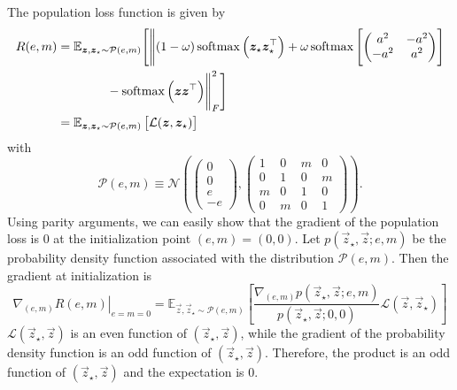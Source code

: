 The population loss function is given by
\begin{equation}\begin{split}
    R(e,m) &= \mathbb{E}_{{\boldsymbol{z}},{\boldsymbol{z}}_\star \sim \mathcal{P}(e,m)} \Biggl[\Biggl\lVert
        (1-\omega) \operatorname{softmax}\left({\boldsymbol{z}}_\star {\boldsymbol{z}}_\star^\top \right) + \omega \operatorname{softmax}\left[\begin{pmatrix}
        a^2 & -a^2 \\
        -a^2 & a^2 \\
    \end{pmatrix}\right] \\
    &\qquad\qquad {}- \operatorname{softmax}\left({\boldsymbol{z}} {\boldsymbol{z}}^\top \right)
    \Biggr\rVert_F^2\Biggr] \\
    &= \mathbb{E}_{{\boldsymbol{z}},{\boldsymbol{z}}_\star \sim \mathcal{P}(e,m)} \left[\mathcal{L}({\boldsymbol{z}},{\boldsymbol{z}}_\star)\right]
\end{split}\end{equation}
with
\begin{equation}
    \mathcal{P}(e,m) \equiv \mathcal{N}\left(
        \begin{pmatrix} 0\\ 0\\ e\\ -e \end{pmatrix},
        \begin{pmatrix}
            1 & 0 & m & 0 \\
            0 & 1 & 0 & m \\
            m & 0 & 1 & 0 \\
            0 & m & 0 & 1
        \end{pmatrix}
    \right).
\end{equation}
Using parity arguments, we can easily show that the gradient of the population loss is 0 at the initialization point \((e,m) = (0,0)\). Let \(p(\vec{z}_\star,\vec{z};e,m)\) be the probability density function associated with the distribution \(\mathcal{P}(e,m)\). Then the gradient at initialization is
\begin{equation}
    \left.\nabla_{(e,m)} R(e,m)\right|_{e=m=0} = \mathbb{E}_{\vec{z},\vec{z}_\star\sim\mathcal{P}(e,m)}\left[
        \frac{\nabla_{(e,m)}p(\vec{z}_\star,\vec{z};e,m)}{p(\vec{z}_\star,\vec{z};0,0)}
        \mathcal{L}(\vec{z},\vec{z}_\star)
    \right] 
\end{equation}
\(\mathcal{L}(\vec{z}_\star,\vec{z})\) is an even function of \((\vec{z}_\star,\vec{z})\), while the gradient of the probability density function is an odd function of \((\vec{z}_\star,\vec{z})\). Therefore, the product is an odd function of \((\vec{z}_\star,\vec{z})\) and the expectation is 0.
